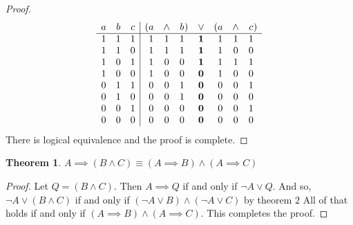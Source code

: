 \documentclass[letter]{article}
\newtheorem{theorem}{Theorem}
\newenvironment{menumerate}{%
  \edef\backupindent{\the\parindent}%
  \enumerate%
  \setlength{\parindent}{\backupindent}%
}{\endenumerate}
\begin{document}
\begin{menumerate}
\begin{menumerate}
\begin{proof}
\begin{equation*}
\begin{array}{ccc|c@{}ccc@{}ccc@{}ccc@{}c}
              a&b&c&(&a&\land&b&)&\lor&(&a&\land&c&)\\\hline
              1&1&1&&1&1&1&&\mathbf{1}&&1&1&1&\\
              1&1&0&&1&1&1&&\mathbf{1}&&1&0&0&\\
              1&0&1&&1&0&0&&\mathbf{1}&&1&1&1&\\
              1&0&0&&1&0&0&&\mathbf{0}&&1&0&0&\\
              0&1&1&&0&0&1&&\mathbf{0}&&0&0&1&\\
              0&1&0&&0&0&1&&\mathbf{0}&&0&0&0&\\
              0&0&1&&0&0&0&&\mathbf{0}&&0&0&1&\\
              0&0&0&&0&0&0&&\mathbf{0}&&0&0&0&
              \end{array}
          \end{equation*}
          There is logical equivalence and the proof is complete.
        \end{proof}

        \item
        \begin{theorem}
            $A \implies (B \wedge C) \equiv (A \implies B) \wedge (A \implies C)       $
        \end{theorem}
        \begin{proof}
            Let $Q = (B \wedge C).$ Then $A \implies Q$ if and only if
            $\neg A \vee Q.$ And so, $\neg A \vee ( B \wedge C)$
            if and only if $(\neg A \vee B) \wedge (\neg A \vee C)$ by theorem $2$ 
            All of that holds if and only if $(A \implies B) \wedge (A \implies C).$
            This completes the proof.
        \end{proof}


\end{menumerate}
\end{menumerate}
\end{document}

